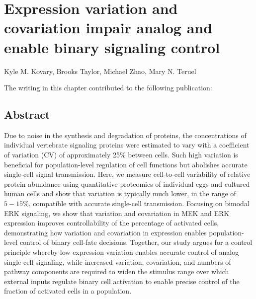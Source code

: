 \chapter{Expression variation and covariation impair analog and enable binary signaling control}

\begin{center}
Kyle M. Kovary, Brooks Taylor, Michael Zhao, Mary N. Teruel
\end{center}

\vspace*{\fill}

\begin{flushleft}
The writing in this chapter contributed to the following publication:
\end{flushleft}
\newline
\newline
{}

\newpage

\section{Abstract}
Due to noise in the synthesis and degradation of proteins, the concentrations of individual vertebrate signaling proteins were estimated to vary with a coefficient of variation (CV) of approximately 25\% between cells. Such high variation is beneficial for population-level regulation of cell functions but abolishes accurate single-cell signal transmission. Here, we measure cell-to-cell variability of relative protein abundance using quantitative proteomics of individual  eggs and cultured human cells and show that variation is typically much lower, in the range of $5-15\%$, compatible with accurate single-cell transmission. Focusing on bimodal ERK signaling, we show that variation and covariation in MEK and ERK expression improves controllability of the percentage of activated cells, demonstrating how variation and covariation in expression enables population-level control of binary cell-fate decisions. Together, our study argues for a control principle whereby low expression variation enables accurate control of analog single-cell signaling, while increased variation, covariation, and numbers of pathway components are required to widen the stimulus range over which external inputs regulate binary cell activation to enable precise control of the fraction of activated cells in a population.

